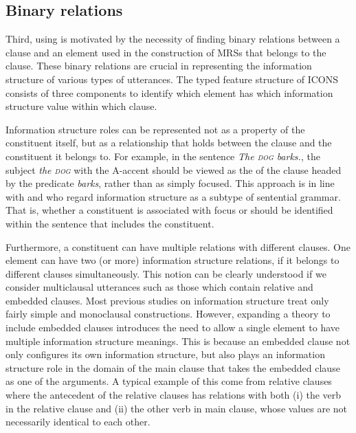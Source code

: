 \subsection{Binary relations}
\label{9:ssec:binary}


Third, using  is motivated by the necessity of finding
binary relations between a clause and an element used in the
construction of MRSs that belongs to the clause. These binary
relations are crucial in representing the information structure of
various types of utterances.  The typed feature structure of ICONS
consists of three components to identify which element has which
information structure value within which clause.


Information structure roles can be represented not as a property of
the constituent itself, but as a relationship that holds between the
clause and the constituent it belongs to. For example, in the 
sentence \textit{The \textsc{dog} barks.}, the subject \textit{the
  \textsc{dog}} with the A-accent should be viewed as the  of
the clause headed by the predicate \textit{barks}, rather than as
simply focused.  This approach is in line with \citet{lambrecht:96}
and \citet{engdahl:vallduvi:96} who regard information structure as a
subtype of sentential grammar. That is, whether a
constituent is associated with focus or  should be identified
within the sentence that includes the constituent.


Furthermore, a constituent can have multiple relations with different
clauses. One element can have two (or more) information structure
relations, if it belongs to different clauses simultaneously.  This
notion can be clearly understood if we consider multiclausal
utterances such as those which contain relative and embedded clauses.
Most previous studies on information structure treat only fairly
simple and monoclausal constructions. However, expanding a theory to
include embedded clauses introduces the need to allow a single element
to have multiple information structure meanings.  This is because an
embedded clause not only configures its own information structure, but
also plays an information structure role in the domain of the main
clause that takes the embedded clause as one of the
arguments. A typical example of this come from
relative clauses where the antecedent of the relative clauses has
relations with both (i) the verb in the relative clause and (ii) the
other verb in main clause, whose values are not necessarily identical
to each other.



